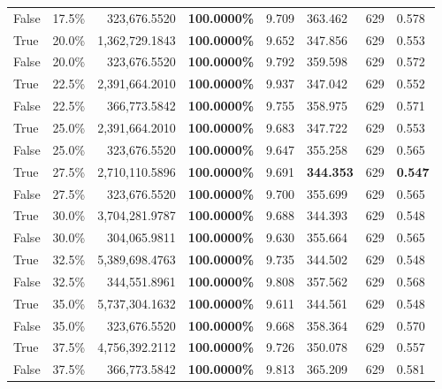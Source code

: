 \begin{table}[H]
\begin{tabular}{|m{}| m{}| r | R{0.13\textwidth}| R{0.09\textwidth}| R{0.09\textwidth}| R{0.09\textwidth}| R{0.11\textwidth}}
False & 17.5\% & 323,676.5520 & \bfseries \color{red} 100.0000\% & 9.709 & 363.462 & 629 & 0.578 \\
True & 20.0\% & 1,362,729.1843 & \bfseries \color{red} 100.0000\% & 9.652 & 347.856 & 629 & 0.553 \\
False & 20.0\% & 323,676.5520 & \bfseries \color{red} 100.0000\% & 9.792 & 359.598 & 629 & 0.572 \\
True & 22.5\% & 2,391,664.2010 & \bfseries \color{red} 100.0000\% & 9.937 & 347.042 & 629 & 0.552 \\
False & 22.5\% & 366,773.5842 & \bfseries \color{red} 100.0000\% & 9.755 & 358.975 & 629 & 0.571 \\
True & 25.0\% & 2,391,664.2010 & \bfseries \color{red} 100.0000\% & 9.683 & 347.722 & 629 & 0.553 \\
False & 25.0\% & 323,676.5520 & \bfseries \color{red} 100.0000\% & 9.647 & 355.258 & 629 & 0.565 \\
True & 27.5\% & 2,710,110.5896 & \bfseries \color{red} 100.0000\% & 9.691 & \bfseries \color{red} 344.353 & 629 & \bfseries \color{red} 0.547 \\
False & 27.5\% & 323,676.5520 & \bfseries \color{red} 100.0000\% & 9.700 & 355.699 & 629 & 0.565 \\
True & 30.0\% & 3,704,281.9787 & \bfseries \color{red} 100.0000\% & 9.688 & 344.393 & 629 & 0.548 \\
False & 30.0\% & \color{red} 304,065.9811 & \bfseries \color{red} 100.0000\% & 9.630 & 355.664 & 629 & 0.565 \\
True & 32.5\% & 5,389,698.4763 & \bfseries \color{red} 100.0000\% & 9.735 & 344.502 & 629 & 0.548 \\
False & 32.5\% & 344,551.8961 & \bfseries \color{red} 100.0000\% & 9.808 & 357.562 & 629 & 0.568 \\
True & 35.0\% & 5,737,304.1632 & \bfseries \color{red} 100.0000\% & 9.611 & 344.561 & 629 & 0.548 \\
False & 35.0\% & 323,676.5520 & \bfseries \color{red} 100.0000\% & 9.668 & 358.364 & 629 & 0.570 \\
True & 37.5\% & 4,756,392.2112 & \bfseries \color{red} 100.0000\% & 9.726 & 350.078 & 629 & 0.557 \\
False & 37.5\% & 366,773.5842 & \bfseries \color{red} 100.0000\% & 9.813 & 365.209 & 629 & 0.581 \\

\end{tabular}
\end{table}
